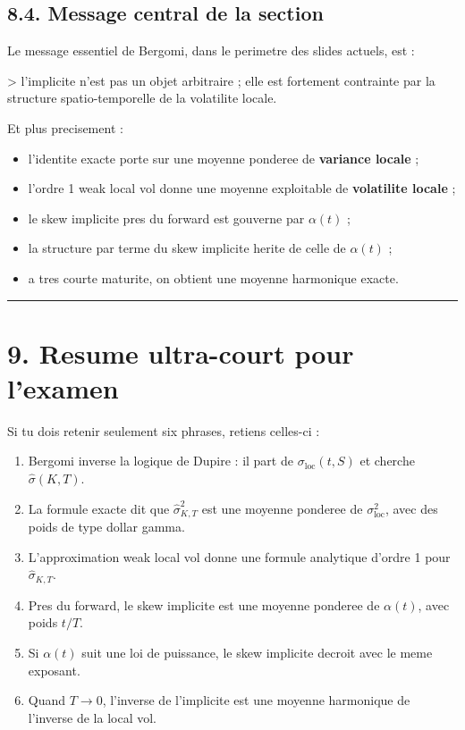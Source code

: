 \documentclass[11pt,a4paper]{article}
\begin{document}
\subsection{8.4. Message central de la section}

Le message essentiel de Bergomi, dans le perimetre des slides actuels, est :

> l'implicite n'est pas un objet arbitraire ; elle est fortement contrainte par la structure spatio-temporelle de la volatilite locale.

Et plus precisement :

\begin{itemize}
\item l'identite exacte porte sur une moyenne ponderee de \textbf{variance locale} ;
\item l'ordre 1 weak local vol donne une moyenne exploitable de \textbf{volatilite locale} ;
\item le skew implicite pres du forward est gouverne par \(\alpha(t)\) ;
\item la structure par terme du skew implicite herite de celle de \(\alpha(t)\) ;
\item a tres courte maturite, on obtient une moyenne harmonique exacte.
\end{itemize}

\bigskip\hrule\bigskip

\section{9. Resume ultra-court pour l'examen}

Si tu dois retenir seulement six phrases, retiens celles-ci :

\begin{enumerate}
\item Bergomi inverse la logique de Dupire : il part de \(\sigma_{\mathrm{loc}}(t,S)\) et cherche \(\widehat{\sigma}(K,T)\).
\item La formule exacte dit que \(\widehat{\sigma}_{K,T}^2\) est une moyenne ponderee de \(\sigma_{\mathrm{loc}}^2\), avec des poids de type dollar gamma.
\item L'approximation weak local vol donne une formule analytique d'ordre 1 pour \(\widehat{\sigma}_{K,T}\).
\item Pres du forward, le skew implicite est une moyenne ponderee de \(\alpha(t)\), avec poids \(t/T\).
\item Si \(\alpha(t)\) suit une loi de puissance, le skew implicite decroit avec le meme exposant.
\item Quand \(T\to 0\), l'inverse de l'implicite est une moyenne harmonique de l'inverse de la local vol.
\end{enumerate}
\end{document}
